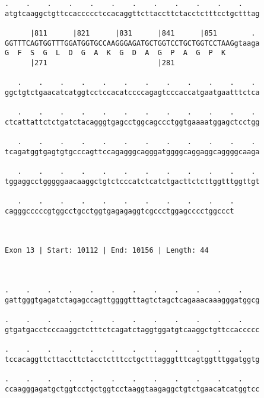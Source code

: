 \documentclass{article}
\begin{document}
\begin{Verbatim}
.    .    .    .    .    .    .    .    .    .    .    .    
atgtcaaggctgttccaccccctccacaggttcttaccttctacctctttcctgctttag
                                                            
      |811      |821      |831      |841      |851        . 
GGTTTCAGTGGTTTGGATGGTGCCAAGGGAGATGCTGGTCCTGCTGGTCCTAAGgtaaga
G  F  S  G  L  D  G  A  K  G  D  A  G  P  A  G  P  K        
      |271                          |281                    
  
   .    .    .    .    .    .    .    .    .    .    .    . 
ggctgtctgaacatcatggtcctccacatccccagagtcccaccatgaatgaatttctca
                                                            
   .    .    .    .    .    .    .    .    .    .    .    . 
ctcattattctctgatctacagggtgagcctggcagccctggtgaaaatggagctcctgg
                                                            
   .    .    .    .    .    .    .    .    .    .    .    . 
tcagatggtgagtgtgcccagttccagagggcagggatggggcaggaggcaggggcaaga
                                                            
   .    .    .    .    .    .    .    .    .    .    .    . 
tggaggcctgggggaacaaggctgtctcccatctcatctgacttctcttggtttggttgt
                                                            
   .    .    .    .    .    .    .    .    .    .    .
cagggcccccgtggcctgcctggtgagagaggtcgccctggagcccctggccct
                                                      
                                                      
 
Exon 13 | Start: 10112 | End: 10156 | Length: 44



.    .    .    .    .    .    .    .    .    .    .    .    
gattgggtgagatctagagccagttggggtttagtctagctcagaaacaaagggatggcg
                                                            
.    .    .    .    .    .    .    .    .    .    .    .    
gtgatgacctcccaaggctctttctcagatctaggtggatgtcaaggctgttccaccccc
                                                            
.    .    .    .    .    .    .    .    .    .    .    .    
tccacaggttcttaccttctacctctttcctgctttagggtttcagtggtttggatggtg
                                                            
.    .    .    .    .    .    .    .    .    .    .    .    
ccaagggagatgctggtcctgctggtcctaaggtaagaggctgtctgaacatcatggtcc
                                                            

\end{Verbatim}
\end{document}
